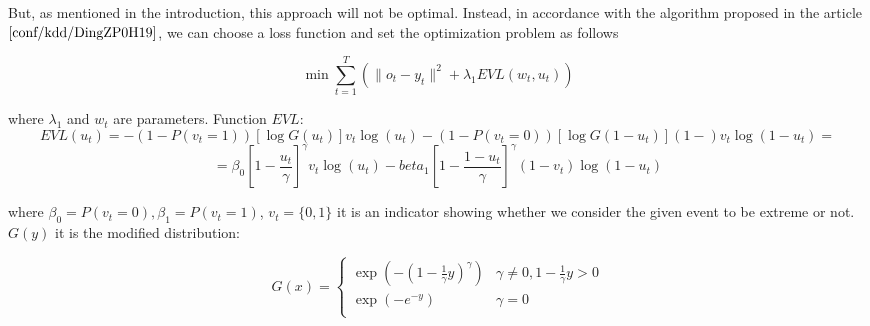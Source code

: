 \documentclass{article}
\begin{document}
But, as mentioned in the introduction, this approach will not be optimal. Instead, in accordance with the algorithm proposed in the article $\cite{conf/kdd/DingZP0H19}$, we can choose a loss function and set the optimization problem as follows 

$$\min\sum\limits_{t = 1}^T(\|o_t - y_t\|^2 + \lambda_1 EVL(w_t, u_t))$$

where $\lambda_1$ and $w_t$ are parameters. Function $EVL$:
$$EVL(u_t) = -(1 - P(v_t = 1))[\log G(u_t)]v_t\log(u_t) - (1 - P(v_t = 0))[\log G(1 - u_t)](1 - )v_t\log(1 - u_t) =$$
$$=\beta_0[1 - \frac{u_t}{\gamma}]^{\gamma}v_t\log(u_t) - beta_1[1 - \frac{1 - u_t}{\gamma}]^{\gamma}(1 - v_t)\log(1 - u_t)$$

where $\beta_0 = P(v_t = 0), \beta_1 = P(v_t = 1)$, $v_t = \{0, 1\}$ it is an indicator showing whether we consider the given event to be extreme or not. 
$G(y)$ it is the modified distribution:


$$G (x) = \left\{
\begin{array}{ll}
\exp(-(1 - \frac{1}{\gamma}y)^{\gamma}) & \gamma \neq 0, 1 - \frac{1}{\gamma}y > 0\\
\exp(-e^{-y}) & \gamma = 0 \\
\end{array}
\right. $$









 


\end{document}
